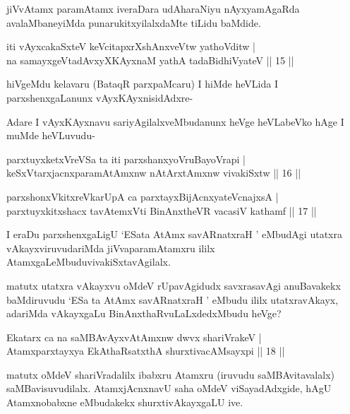 \begin{artha}
jiVvAtamx paramAtamx iveraDara udAharaNiyu nAyxyamAgaRda avalaMbaneyiMda punarukitxyilalxdaMte tiLidu baMdide.
\end{artha}


\begin{shl}
iti vAyxcakaSxteV keVcitapxrXshAnxveVtw yathoVditw |\\
na samayxgeVtadAvxyXKAyxnaM yathA tadaBidhiVyateV \hfill || 15 ||
\end{shl}

\begin{artha}
hiVgeMdu kelavaru (BataqR parxpaMcaru) I hiMde heVLida I parxshenxgaLanunx vAyxKAyxnisidAdxre-

Adare I vAyxKAyxnavu sariyAgilalxveMbudanunx heVge heVLabeVko hAge I muMde heVLuvudu-
\end{artha}

\begin{shl}
parxtuyxketxVreVSa ta iti parxshanxyoVruBayoVrapi |\\
keSxVtarxjacnxparamAtAmxnw nAtArx\s \s tAmxnw vivakiSxtw \hfill || 16 ||
\end{shl}

\begin{shl}
parxshonxVkitxreVkarUpA ca parxtayxBijAcnxyateV\s cnajxsA |\\
parxtuyxkitxshacx tavA\s \s temxVti BinAnxtheVR vacasiV kathamf \hfill || 17 ||
\end{shl}

\begin{artha}
I eraDu parxshenxgaLigU `ESata AtAmx savARnatxraH ' eMbudAgi utatxra vAkayxviruvudariMda jiVvaparamAtamxru ililx AtamxgaLeMbudu\break vivakiSxtavAgilalx.

matutx utatxra vAkayxvu oMdeV rUpavAgidudx savxrasavAgi anuBavakekx baMdiruvudu `ESa ta AtAmx savARnatxraH ' eMbudu ililx utatxravAkayx, adariMda vAkayxgaLu BinAnxthaRvuLaLxdedxMbudu heVge?
\end{artha}%

\begin{shl}
Ekatarx ca na saMBAvAyxvAtAmxnw dwvx shariVrakeV |\\
Atamxparxtayxya EkAthaRsatxthA shurxtivacAMsayxpi \hfill || 18 ||
\end{shl}

\begin{artha}
matutx oMdeV shariVradalilx ibabxru Atamxru (iruvudu saMBAvitavalalx) saMBavisuvudilalx. AtamxjAcnxnavU saha oMdeV viSayadAdxgide, hAgU Atamxnobabxne eMbudakekx shurxtivAkayxgaLU ive.
\end{artha}

